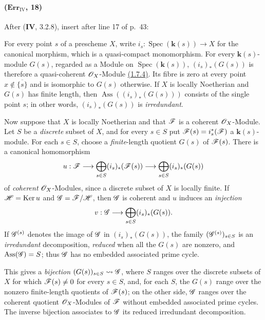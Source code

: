 \paragraph{($\mathbf{Err}_{\mathrm{IV}}$, 18)}
After (\textbf{IV}, 3.2.8), insert after line 17 of p.~43:

\begin{remark}[3.2.9]
\label{IV.3.2.9}
For every point $s$ of a prescheme $X$, write
$i_s:\operatorname{Spec}(\boldsymbol{k}(s))\to X$ for the canonical morphism, which
is a quasi-compact monomorphism.  For every $\boldsymbol{k}(s)$-module $G(s)$,
regarded as a Module on $\operatorname{Spec}(\boldsymbol{k}(s))$,
$(i_s)_*(G(s))$ is therefore a quasi-coherent $\mathscr{O}_X$-Module
{\hyperref[subsection:IV.1.7]{(1.7.4)}}.  Its fibre is zero at every point
$x\notin\overline{\{s\}}$ and is isomorphic to $G(s)$ otherwise.  If
$X$ is locally Noetherian and $G(s)$ has finite length, then
$\operatorname{Ass}((i_s)_*(G(s)))$ consists of the single point $s$;
in other words, $(i_s)_*(G(s))$ is \emph{irredundant}.

Now suppose that $X$ is locally Noetherian and that $\mathscr{F}$ is a
coherent $\mathscr{O}_X$-Module.  Let $S$ be a \emph{discrete} subset of $X$, and
for every $s\in S$ put $\mathscr{F}(s)=i_s^*(\mathscr{F})$ a $\boldsymbol{k}(s)$-module.
For each $s\in S$, choose a \emph{finite}-length quotient $G(s)$ of
$\mathscr{F}(s)$.  There is a canonical homomorphism
\[
 u:\mathscr{F}\longrightarrow
 \bigoplus_{s\in S}(i_s)_*(\mathscr{F}(s))\longrightarrow
 \bigoplus_{s\in S}(i_s)_*(G(s))
\]
of \emph{coherent} $\mathscr{O}_X$-Modules, since a discrete subset of $X$ is
locally finite.  If $\mathscr{H}=\operatorname{Ker}u$ and
$\mathscr{G}=\mathscr{F}/\mathscr{H}$, then $\mathscr{G}$ is coherent and $u$ induces an
\emph{injection}
\[
 v:\mathscr{G}\longrightarrow\bigoplus_{s\in S}(i_s)_*(G(s)).
\]
If $\mathscr{G}^{(s)}$ denotes the image of $\mathscr{G}$ in
$(i_s)_*(G(s))$, the family $(\mathscr{G}^{(s)})_{s\in S}$ is an
\emph{irredundant} decomposition, \emph{reduced} when all the $G(s)$ are nonzero, and
$\operatorname{Ass}(\mathscr{G})=S$; thus $\mathscr{G}$ has no embedded
associated prime cycle.

This gives a \emph{bijection} $(G(s))_{s\in S}\leadsto\mathscr{G}$, where
$S$ ranges over the discrete subsets of $X$ for which
$\mathscr{F}(s)\neq0$ for every $s\in S$, and, for each $S$, the $G(s)$
range over the nonzero finite-length quotients of $\mathscr{F}(s)$; on the
other side, $\mathscr{G}$ ranges over the coherent quotient
$\mathscr{O}_X$-Modules of $\mathscr{F}$ without embedded associated prime
cycles.  The inverse bijection associates to $\mathscr{G}$ its reduced
irredundant decomposition.
\end{remark}

